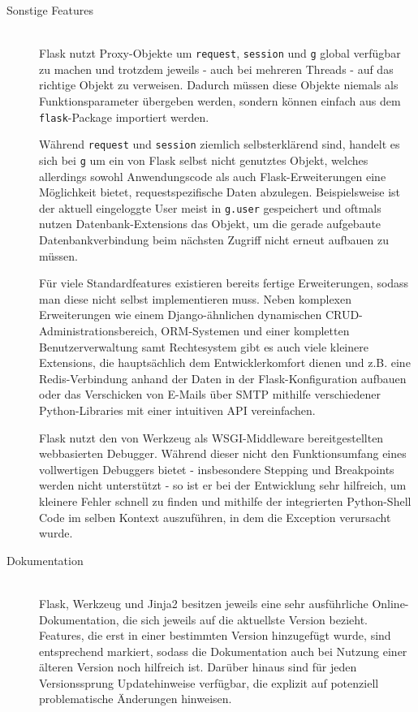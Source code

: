 \begin{description}
\item[Sonstige Features] \hfill \\
Flask nutzt Proxy-Objekte um \lstinline{request}, \lstinline{session} und \lstinline{g} global
verfügbar zu machen und trotzdem jeweils - auch bei mehreren Threads - auf das richtige Objekt zu
verweisen. Dadurch müssen diese Objekte niemals als Funktionsparameter übergeben werden, sondern
können einfach aus dem \lstinline{flask}-Package importiert werden.

Während \lstinline{request} und \lstinline{session} ziemlich selbsterklärend sind, handelt es sich
bei \lstinline{g} um ein von Flask selbst nicht genutztes Objekt, welches allerdings sowohl
Anwendungscode als auch Flask-Erweiterungen eine Möglichkeit bietet, requestspezifische Daten
abzulegen. Beispielsweise ist der aktuell eingeloggte User meist in \lstinline{g.user} gespeichert
und oftmals nutzen Datenbank-Extensions das Objekt, um die gerade aufgebaute Datenbankverbindung
beim nächsten Zugriff nicht erneut aufbauen zu müssen.

Für viele Standardfeatures existieren bereits fertige Erweiterungen, sodass man diese nicht selbst
implementieren muss. Neben komplexen Erweiterungen wie einem Django-ähnlichen dynamischen
CRUD-Administrationsbereich, ORM-Systemen und einer kompletten Benutzerverwaltung samt Rechtesystem
gibt es auch viele kleinere Extensions, die hauptsächlich dem Entwicklerkomfort dienen und z.B. eine
Redis-Verbindung anhand der Daten in der Flask-Konfiguration aufbauen oder das Verschicken von
E-Mails über SMTP mithilfe verschiedener Python-Libraries mit einer intuitiven API vereinfachen.

Flask nutzt den von Werkzeug als WSGI-Middleware bereitgestellten webbasierten Debugger. Während
dieser nicht den Funktionsumfang eines vollwertigen Debuggers bietet - insbesondere Stepping und
Breakpoints werden nicht unterstützt - so ist er bei der Entwicklung sehr hilfreich, um kleinere
Fehler schnell zu finden und mithilfe der integrierten Python-Shell Code im selben Kontext
auszuführen, in dem die Exception verursacht wurde.


\item[Dokumentation] \hfill \\
Flask, Werkzeug und Jinja2 besitzen jeweils eine sehr ausführliche Online-Dokumentation, die sich
jeweils auf die aktuellste Version bezieht. Features, die erst in einer bestimmten Version
hinzugefügt wurde, sind entsprechend markiert, sodass die Dokumentation auch bei Nutzung einer
älteren Version noch hilfreich ist. Darüber hinaus sind für jeden Versionssprung Updatehinweise
verfügbar, die explizit auf potenziell problematische Änderungen hinweisen.


\end{description}
